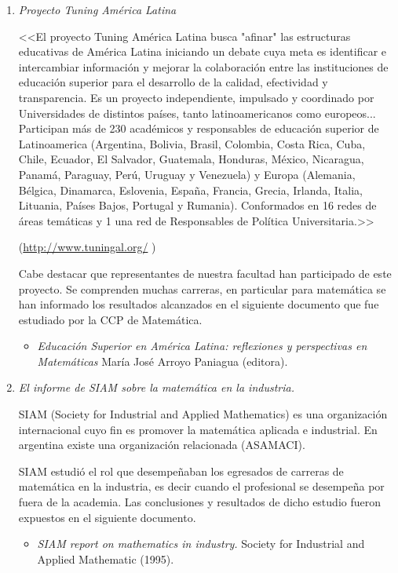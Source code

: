 \documentclass[a4paper,10pt,BCOR10mm,oneside,headsepline]{scrbook}
\begin{document}
\begin{enumerate}
 \item \emph{Proyecto Tuning América Latina}  
 
 <<El proyecto Tuning América Latina busca "afinar" las estructuras educativas de América Latina iniciando un debate cuya meta es identificar e intercambiar información y mejorar la colaboración entre las instituciones de educación superior para el desarrollo de la calidad, efectividad y transparencia. Es un proyecto independiente, impulsado y coordinado por Universidades de distintos países, tanto latinoamericanos como europeos... Participan más de 230 académicos y responsables de educación superior de Latinoamerica (Argentina, Bolivia, Brasil, Colombia, Costa Rica, Cuba, Chile, Ecuador, El Salvador, Guatemala, Honduras, México, Nicaragua, Panamá, Paraguay, Perú, Uruguay y Venezuela) y Europa (Alemania, Bélgica, Dinamarca, Eslovenia, España, Francia, Grecia, Irlanda, Italia, Lituania, Países Bajos, Portugal y Rumania). Conformados en 16 redes de áreas temáticas y 1 una red de Responsables de Política Universitaria.>>  
 
 \begin{flushright} (\href{http://www.tuningal.org/}{http://www.tuningal.org/} )
  
 \end{flushright}

 Cabe destacar que representantes de nuestra facultad  han participado de este proyecto. 
Se comprenden muchas carreras, en particular para matemática se han informado los resultados alcanzados en el siguiente documento que fue estudiado por la CCP de Matemática.
 
 \begin{itemize}
  \item  \emph{Educación Superior en América Latina: reflexiones y perspectivas en Matemáticas } María José Arroyo Paniagua (editora). 
  
 \end{itemize}

\item \emph{El informe de SIAM sobre la matemática en la industria.} 


SIAM (Society for Industrial and Applied Mathematics) es una organización internacional cuyo fin es promover la matemática aplicada e industrial. En argentina existe una organización relacionada (ASAMACI). 

SIAM estudió el rol que desempeñaban los egresados de carreras de matemática en la industria, es decir cuando el profesional se desempeña por fuera de la academia. Las conclusiones y resultados de dicho estudio fueron expuestos en el siguiente documento. 
\begin{itemize}
 \item \emph{SIAM report on mathematics in industry.} Society for Industrial and Applied Mathematic (1995).
\end{itemize}



 
\end{enumerate}
\end{document}
